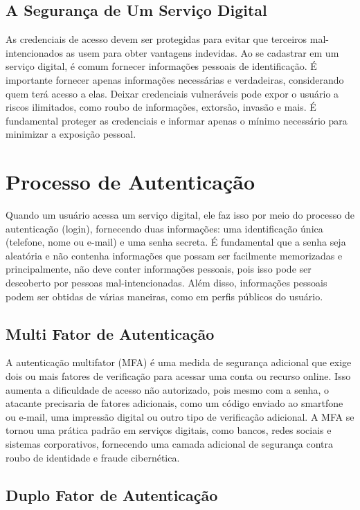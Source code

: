 \documentclass[12pt]{article}
\begin{document}
\subsection{A Segurança de Um Serviço Digital}

As credenciais de acesso devem ser protegidas para evitar que terceiros
mal-intencionados as usem para obter vantagens indevidas.
Ao se cadastrar em um serviço digital, é comum fornecer informações
pessoais de identificação.
É importante fornecer apenas informações necessárias e verdadeiras,
considerando quem terá acesso a elas. Deixar credenciais vulneráveis pode
expor o usuário a riscos ilimitados, como roubo de informações, extorsão,
invasão e mais.
É fundamental proteger as credenciais e informar apenas o mínimo necessário
para minimizar a exposição pessoal.

\section{Processo de Autenticação}

Quando um usuário acessa um serviço digital, ele faz isso por meio do
processo de autenticação (login), fornecendo duas informações: uma
identificação única (telefone, nome ou e-mail) e uma senha secreta.
É fundamental que a senha seja aleatória e não contenha informações
que possam ser facilmente memorizadas e principalmente, não deve conter
informações pessoais, pois isso pode ser descoberto por pessoas
mal-intencionadas.
Além disso, informações pessoais podem ser obtidas de várias maneiras,
como em perfis públicos do usuário.

\subsection{Multi Fator de Autenticação}

A autenticação multifator (MFA) é uma medida de segurança adicional que
exige dois ou mais fatores de verificação para acessar uma conta ou
recurso online.
Isso aumenta a dificuldade de acesso não autorizado, pois mesmo com a
senha, o atacante precisaria de fatores adicionais, como um código
enviado ao smartfone ou e-mail, uma impressão digital ou outro tipo de
verificação adicional.
A MFA se tornou uma prática padrão em serviços digitais, como bancos,
redes sociais e sistemas corporativos, fornecendo uma camada adicional
de segurança contra roubo de identidade e fraude cibernética.

\subsection{Duplo Fator de Autenticação}
\end{document}
